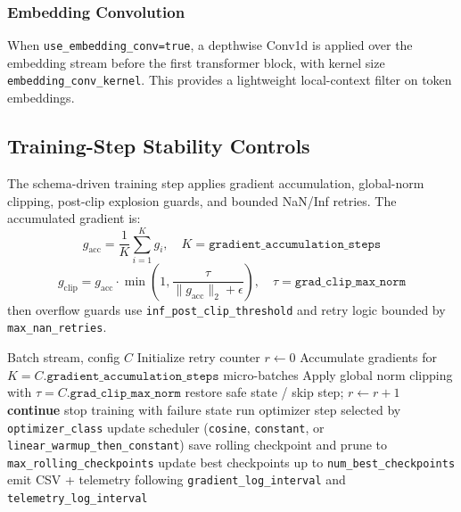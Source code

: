 \subsubsection{Embedding Convolution}
When \texttt{use\_embedding\_conv=true}, a depthwise Conv1d is applied over the embedding stream before the first transformer block, with kernel size \texttt{embedding\_conv\_kernel}. This provides a lightweight local-context filter on token embeddings.

\subsection{Training-Step Stability Controls}

The schema-driven training step applies gradient accumulation, global-norm clipping, post-clip explosion guards, and bounded NaN/Inf retries. The accumulated gradient is:
\[
g_{\text{acc}}=\frac{1}{K}\sum_{i=1}^{K} g_i,\quad K=\texttt{gradient\_accumulation\_steps}
\]
\[
g_{\text{clip}} = g_{\text{acc}}\cdot
\min\left(1,\frac{\tau}{\|g_{\text{acc}}\|_2+\epsilon}\right),\quad
\tau=\texttt{grad\_clip\_max\_norm}
\]
then overflow guards use \texttt{inf\_post\_clip\_threshold} and retry logic bounded by \texttt{max\_nan\_retries}.

\begin{algorithm}[t]
\caption{Schema-Driven Training Step with Stability Controls}
\begin{algorithmic}[1]
\Require Batch stream, config $C$
\State Initialize retry counter $r\gets 0$
    \State Accumulate gradients for $K=C.\texttt{gradient\_accumulation\_steps}$ micro-batches
    \State Apply global norm clipping with $\tau=C.\texttt{grad\_clip\_max\_norm}$
            \State restore safe state / skip step; $r \gets r+1$
            \State \textbf{continue}
        \Else
            \State stop training with failure state
        \EndIf
    \EndIf
    \State run optimizer step selected by \texttt{optimizer\_class}
    \State update scheduler (\texttt{cosine}, \texttt{constant}, or \texttt{linear\_warmup\_then\_constant})
        \State save rolling checkpoint and prune to \texttt{max\_rolling\_checkpoints}
    \EndIf
    \State update best checkpoints up to \texttt{num\_best\_checkpoints}
    \State emit CSV + telemetry following \texttt{gradient\_log\_interval} and \texttt{telemetry\_log\_interval}
\EndFor
\end{algorithmic}
\end{algorithm}

